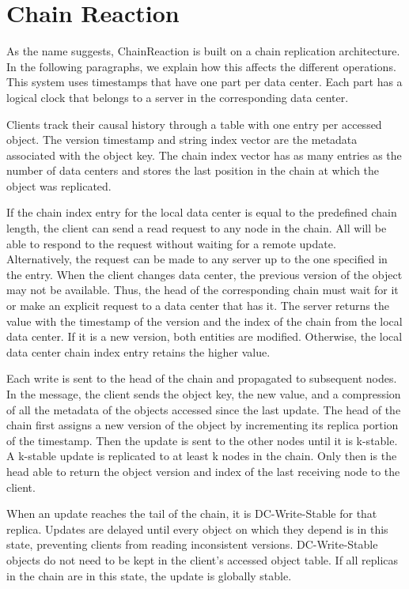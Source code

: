 \section{Chain Reaction}
\label{sec:soa:chain-reaction}

As the name suggests, ChainReaction \cite{almeida2013chainreaction} is built on a chain replication architecture. In the following paragraphs, we explain how this affects the different operations. This system uses timestamps that have one part per data center. Each part has a logical clock that belongs to a server in the corresponding data center. 

Clients track their causal history through a table with one entry per accessed object. The version timestamp and string index vector are the metadata associated with the object key. The chain index vector has as many entries as the number of data centers and stores the last position in the chain at which the object was replicated. 

If the chain index entry for the local data center is equal to the predefined chain length, the client can send a read request to any node in the chain. All will be able to respond to the request without waiting for a remote update. Alternatively, the request can be made to any server up to the one specified in the entry. When the client changes data center, the previous version of the object may not be available. Thus, the head of the corresponding chain must wait for it or make an explicit request to a data center that has it. The server returns the value with the timestamp of the version and the index of the chain from the local data center. If it is a new version, both entities are modified. Otherwise, the local data center chain index entry retains the higher value. 

Each write is sent to the head of the chain and propagated to subsequent nodes. In the message, the client sends the object key, the new value, and a compression of all the metadata of the objects accessed since the last update. The head of the chain first assigns a new version of the object by incrementing its replica portion of the timestamp. Then the update is sent to the other nodes until it is k-stable. A k-stable update is replicated to at least k nodes in the chain. Only then is the head able to return the object version and index of the last receiving node to the client. 

When an update reaches the tail of the chain, it is DC-Write-Stable for that replica. Updates are delayed until every object on which they depend is in this state, preventing clients from reading inconsistent versions. DC-Write-Stable objects do not need to be kept in the client's accessed object table. If all replicas in the chain are in this state, the update is globally stable. 

